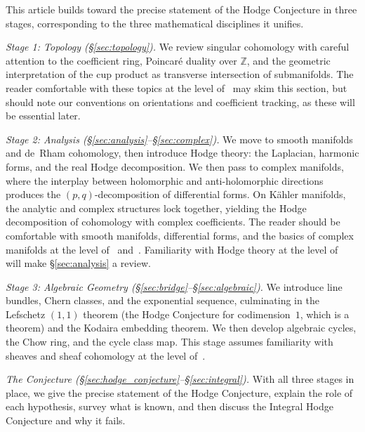 \documentclass{article}
\newcommand{\Z}{{\mathbb{Z}}}
\begin{document}
This article builds toward the precise statement of the Hodge Conjecture in
three stages, corresponding to the three mathematical disciplines it unifies.

\emph{Stage 1: Topology (\S\ref{sec:topology}).}
We review singular cohomology with careful attention to the coefficient ring, Poincar\'{e} duality over $\Z$,
and the geometric interpretation of the cup product as transverse intersection of submanifolds. The reader
comfortable with these topics at the level of~\cite{NateAlgTop} may skim this section, but should note our
conventions on orientations and coefficient tracking, as these will be essential later.

\emph{Stage 2: Analysis (\S\ref{sec:analysis}--\S\ref{sec:complex}).}
We move to smooth manifolds and de~Rham cohomology, then introduce Hodge theory: the Laplacian, harmonic
forms, and the real Hodge decomposition. We then pass to complex manifolds, where the interplay between
holomorphic and anti-holomorphic directions produces the $(p,q)$-decomposition of differential forms. On
K\"{a}hler manifolds, the analytic and complex structures lock together, yielding the Hodge decomposition of
cohomology with complex coefficients. The reader should be comfortable with smooth manifolds, differential
forms, and the basics of complex manifolds at the level of~\cite{NateDiffGeo} and~\cite{NateComplexAnalysis}.
Familiarity with Hodge theory at the level of~\cite{NateHodge} will make \S\ref{sec:analysis} a review.

\emph{Stage 3: Algebraic Geometry (\S\ref{sec:bridge}--\S\ref{sec:algebraic}).}
We introduce line bundles, Chern classes, and the exponential sequence, culminating in the Lefschetz $(1,1)$
theorem (the Hodge Conjecture for codimension~$1$, which is a theorem) and the Kodaira embedding theorem. We
then develop algebraic cycles, the Chow ring, and the cycle class map. This stage assumes familiarity with
sheaves and sheaf cohomology at the level of~\cite{NateAlgGeo}.

\emph{The Conjecture (\S\ref{sec:hodge_conjecture}--\S\ref{sec:integral}).}
With all three stages in place, we give the precise statement of the Hodge
Conjecture, explain the role of each hypothesis, survey what is known, and then
discuss the Integral Hodge Conjecture and why it fails.
\end{document}
